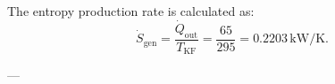 The entropy production rate is calculated as:  
\[
\dot{S}_{\text{gen}} = \frac{\dot{Q}_{\text{out}}}{T_{\text{KF}}} = \frac{65}{295} = 0.2203 \, \text{kW/K}.
\]

---